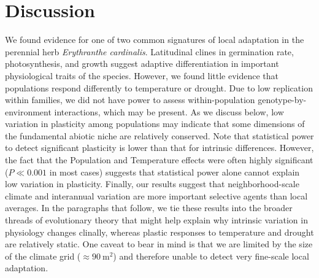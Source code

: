 \documentclass[11pt, oneside]{article}
\begin{document}
\section*{Discussion}

We found evidence for one of two common signatures of local adaptation in the perennial herb \textit{Erythranthe cardinalis}. Latitudinal clines in germination rate, photosynthesis, and growth suggest adaptive differentiation in important physiological traits of the species. However, we found little evidence that populations respond differently to temperature or drought. Due to low replication within families, we did not have power to assess within-population genotype-by-environment interactions, which may be present. As we discuss below, low variation in plasticity among populations may indicate that some dimensions of the fundamental abiotic niche are relatively conserved. Note that statistical power to detect significant plasticity is lower than that for intrinsic differences. However, the fact that the Population and Temperature effects were often highly significant ($P \ll 0.001$ in most cases) suggests that statistical power alone cannot explain low variation in plasticity. Finally, our results suggest that neighborhood-scale climate and interannual variation are more important selective agents than local averages. In the paragraphs that follow, we tie these results into the broader threads of evolutionary theory that might help explain why intrinsic variation in physiology changes clinally, whereas plastic responses to temperature and drought are relatively static. One caveat to bear in mind is that we are limited by the size of the climate grid ($\approx 90~\text{m}^2$) and therefore unable to detect very fine-scale local adaptation.
\end{document}
